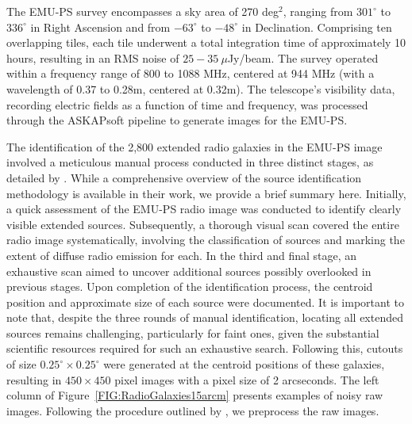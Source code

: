 \documentclass[
  journal=pasa,
  manuscript=research-paper, %
  year=2020,
  volume=37,
]{cup-journal}
\begin{document}
The EMU-PS survey encompasses a sky area of 270 deg$^2$, ranging from $301^{\circ}$ to $336^{\circ}$ in Right Ascension and from $-63^{\circ}$ to $-48^{\circ}$ in Declination. 
Comprising ten overlapping tiles, each tile underwent a total integration time of approximately 10 hours, resulting in an RMS noise of $25-35~\mu$Jy/beam. 
The survey operated within a frequency range of 800 to 1088 MHz, centered at 944 MHz (with a wavelength of 0.37 to 0.28m, centered at 0.32m). 
The telescope's visibility data, recording electric fields as a function of time and frequency, was processed through the ASKAPsoft pipeline \citep[][]{whiting17} to generate images for the EMU-PS.

The identification of the 2,800 extended radio galaxies in the EMU-PS image involved a meticulous manual process conducted in three distinct stages, as detailed by \citet{yew22prep}. 
While a comprehensive overview of the source identification methodology is available in their work, we provide a brief summary here. Initially, a quick assessment of the EMU-PS radio image was conducted to identify clearly visible extended sources. 
Subsequently, a thorough visual scan covered the entire radio image systematically, involving the classification of sources and marking the extent of diffuse radio emission for each. 
In the third and final stage, an exhaustive scan aimed to uncover additional sources possibly overlooked in previous stages. 
Upon completion of the identification process, the centroid position and approximate size of each source were documented. 
It is important to note that, despite the three rounds of manual identification, locating all extended sources remains challenging, particularly for faint ones, given the substantial scientific resources required for such an exhaustive search.
Following this, cutouts of size $0.25^{\circ}\times 0.25^{\circ}$ were generated at the centroid positions of these galaxies, resulting in $450\times 450$ pixel images with a pixel size of 2 arcseconds. 
The left column of Figure~\ref{FIG:RadioGalaxies15arcm} presents examples of noisy raw images.
Following the procedure outlined by \cite{gupta2023a}, we preprocess the raw images. 
\end{document}
